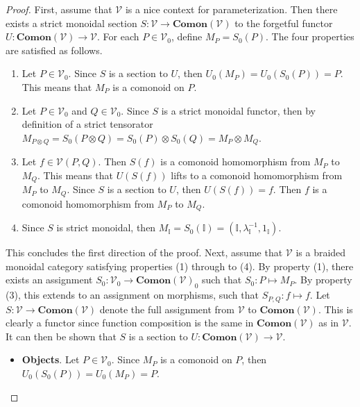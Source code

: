 \begin{proof}
    First, assume that $\mathcal{V}$ is a nice context for parameterization.
    Then there exists a strict monoidal section $S: \mathcal{V} \to \mathbf{Comon}( \mathcal{V} )$ to the forgetful functor $U: \mathbf{Comon}( \mathcal{V} ) \to \mathcal{V}$.
    For each $P \in \mathcal{V}_0$, define $M_P = S_0( P )$.
    The four properties are satisfied as follows.
    \begin{enumerate}
    \item Let $P \in \mathcal{V}_0$.
          Since $S$ is a section to $U$, then $U_0( M_P ) = U_0( S_0( P ) ) = P$.
          This means that $M_P$ is a comonoid on $P$.
    \item Let $P \in \mathcal{V}_0$ and $Q \in \mathcal{V}_0$.
          Since $S$ is a strict monoidal functor, then by definition of a strict tensorator $M_{P \otimes Q} = S_0( P \otimes Q ) = S_0( P ) \otimes S_0( Q ) = M_P \otimes M_Q$.
    \item Let $f \in \mathcal{V}( P, Q )$.
          Then $S( f )$ is a comonoid homomorphism from $M_P$ to $M_Q$.
          This means that $U( S( f ) )$ lifts to a comonoid homomorphism from $M_P$ to $M_Q$.
          Since $S$ is a section to $U$, then $U( S( f ) ) = f$.
          Then $f$ is a comonoid homomorphism from $M_P$ to $M_Q$.
    \item Since $S$ is strict monoidal, then $M_{\mathbb{I}} = S_0( \mathbb{I} ) = ( \mathbb{I}, \lambda^{-1}_{\mathbb{I}}, 1_{\mathbb{I}} )$.
    \end{enumerate}
    This concludes the first direction of the proof.
    Next, assume that $\mathcal{V}$ is a braided monoidal category satisfying properties (1) through to (4).
    By property (1), there exists an assignment $S_0: \mathcal{V}_0 \to \mathbf{Comon}( \mathcal{V} )_0$ such that $S_0: P \mapsto M_P$.
    By property (3), this extends to an assignment on morphisms, such that $S_{P,Q}: f \mapsto f$.
    Let $S: \mathcal{V} \to \mathbf{Comon}( \mathcal{V} )$ denote the full assignment from $\mathcal{V}$ to $\mathbf{Comon}( \mathcal{V} )$.
    This is clearly a functor since function composition is the same in $\mathbf{Comon}( \mathcal{V} )$ as in $\mathcal{V}$.
    It can then be shown that $S$ is a section to $U: \mathbf{Comon}( \mathcal{V} ) \to \mathcal{V}$.
    \begin{itemize}
    \item \textbf{Objects}.
          Let $P \in \mathcal{V}_0$.
          Since $M_P$ is a comonoid on $P$, then $U_0( S_0( P ) ) = U_0( M_P ) = P$.

\end{itemize}
\end{proof}
